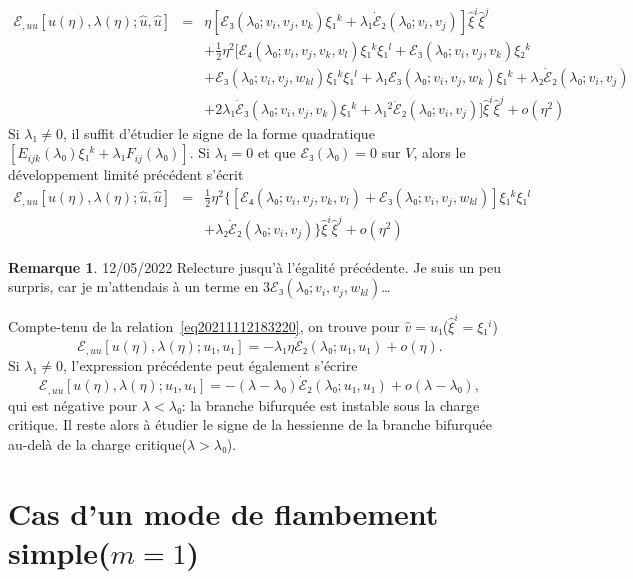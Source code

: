 \documentclass[12pt, final]{amsart}
\theoremstyle{definition}
\newtheorem{remark}{Remarque}
\begin{document}
\begin{eqnarray}
 ℰ_{, u u} [u(η), λ(η) ; \hat{u}, \hat{u}] &
 = & η [ℰ₃(λ₀ ; v_i, v_j, v_k) ξ₁^k + λ₁
 \dot{ℰ}₂(λ₀ ; v_i, v_j)] \hat{ξ}^i \hat{ξ}^j
 \nonumber\\
 & & + \tfrac{1}{2} η^2 [ℰ₄(λ₀ ; v_i, v_j, v_k, v_l)
 ξ₁^k ξ₁^l +ℰ₃(λ₀ ; v_i, v_j, v_k) ξ₂^k
  \nonumber\\
 & & +ℰ₃(λ₀ ; v_i, v_j, w_{k l}) ξ₁^k
 ξ₁^l + λ₁ ℰ₃(λ₀ ; v_i, v_j, w_k) ξ₁^k +
 λ₂ \dot{ℰ}₂(λ₀ ; v_i, v_j) \nonumber\\
 & & + 2 λ₁ \dot{ℰ}₃(λ₀ ; v_i, v_j,
 v_k) ξ₁^k + λ₁^2 \ddot{ℰ}₂(λ₀ ; v_i, v_j)]
 \hat{ξ}^i \hat{ξ}^j + o(η^2) \nonumber
\end{eqnarray}
Si \(λ₁ \neq 0\), il suffit d'étudier le signe de la forme
quadratique \([E_{i j k}(λ₀) ξ₁^k + λ₁ F_{i
 j}(λ₀)] .\) Si \(λ₁ = 0\) et que \(ℰ₃
(λ₀) = 0\) sur \(V\), alors le développement limité
précédent s'écrit
\begin{eqnarray}
 ℰ_{, u u} [u(η), λ(η) ; \hat{u}, \hat{u}] &
 = & \tfrac{1}{2} η^2 \{ [ℰ₄(λ₀ ; v_i, v_j, v_k, v_l)
  +ℰ₃(λ₀ ; v_i, v_j, w_{k l})] ξ₁^k
 ξ₁^l \nonumber\\
 & & + λ₂ \dot{ℰ}₂(λ₀ ; v_i, v_j) \}
 \hat{ξ}^i \hat{ξ}^j + o(η^2) \nonumber
\end{eqnarray}

\begin{remark}
 12/05/2022 Relecture jusqu'à l'égalité précédente. Je  suis un peu surpris, car je m'attendais à un terme en \(3ℰ₃(λ₀ ; v_i, v_j, w_{k l})\)\dots
\end{remark}

Compte-tenu de la relation~\eqref{eq20211112183220}, on trouve pour \(\hat{v} = u₁\)(\(\hat{ξ}^i = ξ₁^i\))
\begin{equation}
 ℰ_{, u u} [u(η), λ(η) ; u₁, u₁] = -
 λ₁ η \dot{ℰ}₂(λ₀ ; u₁, u₁) + o(η) .
\end{equation}
Si \(λ₁ \neq 0\), l'expression précédente peut également s'écrire
\begin{equation}
 ℰ_{, u u} [u(η), λ(η) ; u₁, u₁] = -
 (λ - λ₀) \dot{ℰ}₂(λ₀ ; u₁, u₁) + o
 (λ - λ₀),
\end{equation}
qui est négative pour \(λ < λ₀\): la branche bifurquée est instable sous la charge critique. Il reste alors à étudier le signe de la hessienne de la branche bifurquée au-delà de la charge critique(\(λ > λ₀\)).

\section{Cas d'un mode de flambement simple(\(m = 1\))}
\end{document}
